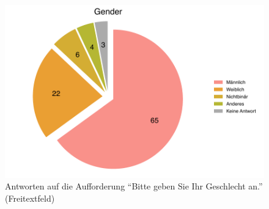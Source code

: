 \documentclass{scrartcl}
\begin{document}
\begin{figure}[ht]
   \includegraphics[width=1\textwidth]{gender.pdf}
   \caption{Antworten auf die Aufforderung \enquote{Bitte geben Sie Ihr Geschlecht an.} (Freitextfeld)}
   \label{fig:gender}
\end{figure}
\end{document}
